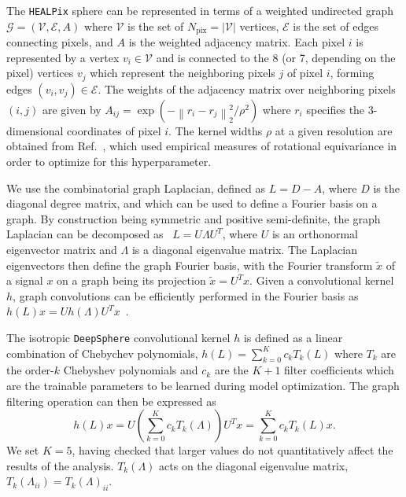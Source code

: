 \documentclass[prd,aps,10pt,nofootinbib,twocolumn,superscriptaddress,preprintnumbers,balancelastpage,longbibliography,floatfix]{revtex4-2}
\begin{document}
The \texttt{HEALPix} sphere can be represented in terms of a weighted undirected graph $\mathcal G = (\mathcal V, \mathcal E, A)$ where $\mathcal V$ is the set of $N_\mathrm{pix} = |\mathcal V|$ vertices, $\mathcal E$ is the set of edges connecting pixels, and $A$ is the weighted adjacency matrix. Each pixel $i$ is represented by a vertex $v_i \in \mathcal V$ and is connected to the 8 (or 7, depending on the pixel)
vertices $v_j$ which represent the neighboring pixels $j$ of pixel $i$, forming edges $(v_i
, v_j) \in \mathcal E$. The weights of the adjacency matrix over neighboring pixels $(i, j)$ are given by $A_{ij} = \exp \left(-{\left\|r_{i}-r_{j}\right\|_{2}^{2}}/{\rho^{2}}\right)$ where $r_i$ specifies the 3-dimensional coordinates of pixel $i$. The kernel widths $\rho$ at a given \HEALPix resolution are obtained from Ref.~\cite{DBLP:conf/iclr/DefferrardMGP20}, which used empirical measures of rotational equivariance in order to optimize for this hyperparameter.

We use the combinatorial graph Laplacian, defined as $ L = D - A$, where $ D$ is the diagonal degree matrix, and which can be used to define a Fourier basis on a graph. By construction being symmetric and positive semi-definite, the graph Laplacian can be decomposed as~\cite{DBLP:conf/nips/DefferrardBV16} $L =  U  \Lambda  U^T$, where $ U$ is an orthonormal eigenvector matrix and $ \Lambda$ is a diagonal eigenvalue matrix. The Laplacian eigenvectors then define the graph Fourier basis, with the Fourier transform $\tilde{x}$ of a signal $ x$ on a graph being its projection $\tilde{x} = U^T x$.
Given a convolutional kernel $h$, graph convolutions can be efficiently performed in the Fourier basis as $h({L}) {x}={U} h({\Lambda}) {U}^{T} {x}$~\cite{DBLP:conf/nips/DefferrardBV16}.

The isotropic \texttt{DeepSphere} convolutional kernel $h$ is defined as a linear combination of Chebychev polynomials, $h({{L}}) = \sum_{k=0}^{K} c_{k} T_{k}({{L}})$ where $T_k$ are the order-$k$ Chebyshev polynomials and $c_k$ are the $K + 1$ filter coefficients which are the trainable parameters to be learned during model optimization. The graph filtering operation can then be expressed as
\begin{equation}
h({L}) {x}={U}\left(\sum_{k=0}^{K} c_{k} T_k({\Lambda})\right) {U}^{T} {x}=\sum_{k=0}^{K} c_{k} T_k({L}) {x}.
\end{equation}
We set $K=5$, having checked that larger values do not quantitatively affect the results of the analysis. $T_k({\Lambda})$ acts on the diagonal eigenvalue matrix, $T_k({\Lambda_{ii}}) = T_k({\Lambda})_{ii}$. 
\end{document}
